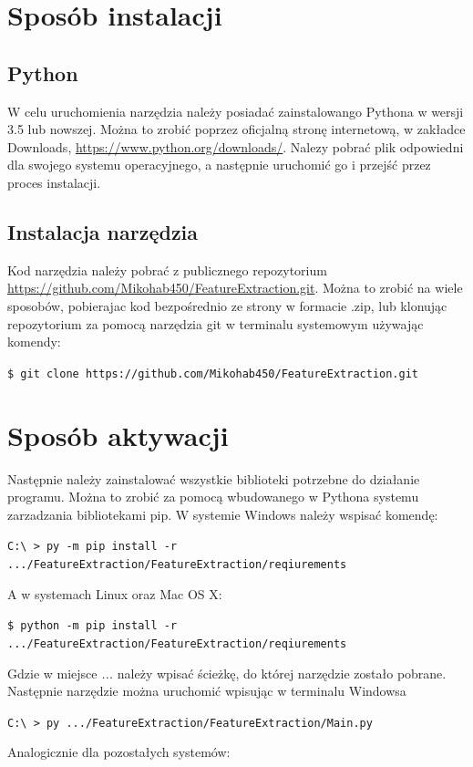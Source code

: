 \documentclass[a4paper,twoside,12pt]{book}
\begin{document}
{\begin{itemize}
\end{itemize}
 
\section {Sposób instalacji}
\subsection{Python}
{W celu uruchomienia narzędzia należy posiadać zainstalowango Pythona w wersji 3.5 lub nowszej. Można to zrobić poprzez oficjalną stronę internetową, w zakładce Downloads, \url{https://www.python.org/downloads/}. Nalezy pobrać plik odpowiedni dla swojego systemu operacyjnego, a następnie uruchomić go i przejść przez proces instalacji.}
\subsection{Instalacja narzędzia}
{Kod narzędzia należy pobrać z publicznego repozytorium \url{https://github.com/Mikohab450/FeatureExtraction.git}. Można to zrobić na wiele sposobów, pobierajac kod bezpośrednio ze strony w formacie .zip, lub klonując repozytorium za pomocą narzędzia git w terminalu  systemowym używając komendy: }

{\lstinline|$ git clone https://github.com/Mikohab450/FeatureExtraction.git| }

\section{Sposób aktywacji}
{Następnie należy zainstalować wszystkie biblioteki potrzebne do działanie programu. Można to zrobić za pomocą wbudowanego w Pythona systemu zarzadzania bibliotekami pip. W systemie Windows należy wspisać komendę:}


{\lstinline|C:\ > py -m pip install -r .../FeatureExtraction/FeatureExtraction/reqiurements | }

{A w systemach Linux oraz Mac OS X:}


{\lstinline|$ python -m pip install -r .../FeatureExtraction/FeatureExtraction/reqiurements| }

{Gdzie w miejsce \emph{...} należy wpisać ścieżkę, do której narzędzie zostało pobrane. Następnie narzędzie można uruchomić wpisując w terminalu Windowsa}

{\lstinline|C:\ > py .../FeatureExtraction/FeatureExtraction/Main.py| }

{Analogicznie dla pozostałych systemów:}

}
\end{document}
